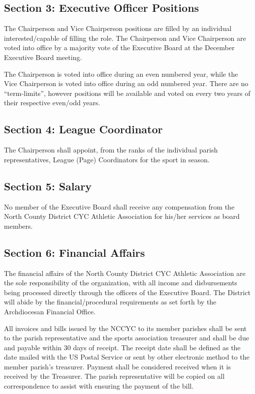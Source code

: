 \documentclass[letteraper,10pt,oneside,draft]{memoir}
\begin{document}
\subsection{Section 3: Executive Officer Positions}
The Chairperson and Vice Chairperson positions are filled by an individual interested/capable of filling the role. The Chairperson and Vice Chairperson are voted into office by a majority vote of the Executive Board at the December Executive Board meeting.

The Chairperson is voted into office during an even numbered year, while the Vice Chairperson is voted into office during an odd numbered year. There are no “term-limits”, however positions will be available and voted on every two years of their respective even/odd years.

\subsection{Section 4: League Coordinator}
The Chairperson shall appoint, from the ranks of the individual parish representatives, League (Page) Coordinators for the sport in season.

\subsection{Section 5: Salary}
No member of the Executive Board shall receive any compensation from the North County District CYC Athletic Association for his/her services as board members.

\subsection{Section 6: Financial Affairs}
The financial affairs of the North County District CYC Athletic Association are the sole responsibility of the organization, with all income and disbursements being processed directly through the officers of the Executive Board.  The District will abide by the financial/procedural requirements as set forth by the Archdiocesan Financial Office.

All invoices and bills issued by the NCCYC to its member parishes shall be sent to the parish representative and the sports association treasurer and shall be due and payable within 30 days of receipt.  The receipt date shall be defined as the date mailed with the US Postal Service or sent by other electronic method to the member parish’s treasurer.  Payment shall be considered received when it is received by the Treasurer.  The parish representative will be copied on all correspondence to assist with ensuring the payment of the bill.
\end{document}
